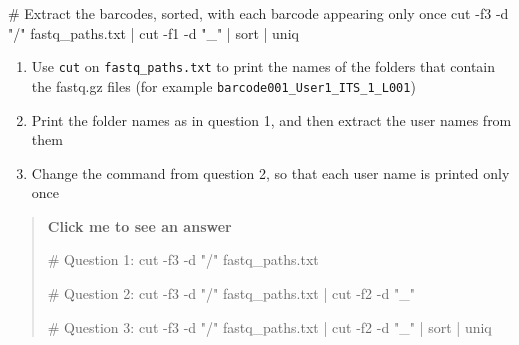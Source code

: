 \documentclass[
  letterpaper,
  DIV=11,
  numbers=noendperiod]{scrreprt}
\newenvironment{Shaded}{}{}
\newcommand{\AttributeTok}[1]{\textcolor[rgb]{0.84,0.23,0.29}{#1}}
\newcommand{\CommentTok}[1]{\textcolor[rgb]{0.42,0.45,0.49}{#1}}
\newcommand{\FunctionTok}[1]{\textcolor[rgb]{0.44,0.26,0.76}{#1}}
\newcommand{\KeywordTok}[1]{\textcolor[rgb]{0.84,0.23,0.29}{#1}}
\newcommand{\NormalTok}[1]{\textcolor[rgb]{0.14,0.16,0.18}{#1}}
\newcommand{\StringTok}[1]{\textcolor[rgb]{0.01,0.18,0.38}{#1}}
\providecommand{\tightlist}{%
  \setlength{\itemsep}{0pt}\setlength{\parskip}{0pt}}
\begin{document}
\begin{Shaded}
\begin{Highlighting}[]
\CommentTok{\# Extract the barcodes, sorted, with each barcode appearing only once}
\FunctionTok{cut} \AttributeTok{{-}f3} \AttributeTok{{-}d} \StringTok{"/"}\NormalTok{ fastq\_paths.txt }\KeywordTok{|} \FunctionTok{cut} \AttributeTok{{-}f1} \AttributeTok{{-}d} \StringTok{"\_"} \KeywordTok{|} \FunctionTok{sort} \KeywordTok{|} \FunctionTok{uniq}
\end{Highlighting}
\end{Shaded}

\begin{tcolorbox}[enhanced jigsaw, coltitle=black, breakable, titlerule=0mm, colback=white, rightrule=.15mm, bottomrule=.15mm, toprule=.15mm, colframe=quarto-callout-color-frame, colbacktitle=quarto-callout-color!10!white, bottomtitle=1mm, opacitybacktitle=0.6, toptitle=1mm, leftrule=.75mm, arc=.35mm, title=\textcolor{quarto-callout-color}{\faInfo}\hspace{0.5em}{Exercise}, left=2mm, opacityback=0]

\begin{enumerate}
\def\labelenumi{\arabic{enumi}.}
\tightlist
\item
  Use \texttt{cut} on \texttt{fastq\_paths.txt} to print the names of
  the folders that contain the fastq.gz files (for example
  \texttt{barcode001\_User1\_ITS\_1\_L001})
\item
  Print the folder names as in question 1, and then extract the user
  names from them
\item
  Change the command from question 2, so that each user name is printed
  only once
\end{enumerate}

\begin{quote}
\textbf{Click me to see an answer}

\begin{Shaded}
\begin{Highlighting}[]
\CommentTok{\# Question 1:}
\FunctionTok{cut} \AttributeTok{{-}f3} \AttributeTok{{-}d} \StringTok{"/"}\NormalTok{ fastq\_paths.txt}

\CommentTok{\# Question 2:}
\FunctionTok{cut} \AttributeTok{{-}f3} \AttributeTok{{-}d} \StringTok{"/"}\NormalTok{ fastq\_paths.txt }\KeywordTok{|} \FunctionTok{cut} \AttributeTok{{-}f2} \AttributeTok{{-}d} \StringTok{"\_"}

\CommentTok{\# Question 3:}
\FunctionTok{cut} \AttributeTok{{-}f3} \AttributeTok{{-}d} \StringTok{"/"}\NormalTok{ fastq\_paths.txt }\KeywordTok{|} \FunctionTok{cut} \AttributeTok{{-}f2} \AttributeTok{{-}d} \StringTok{"\_"} \KeywordTok{|} \FunctionTok{sort} \KeywordTok{|} \FunctionTok{uniq}
\end{Highlighting}
\end{Shaded}
\end{quote}

\end{tcolorbox}
\end{document}
